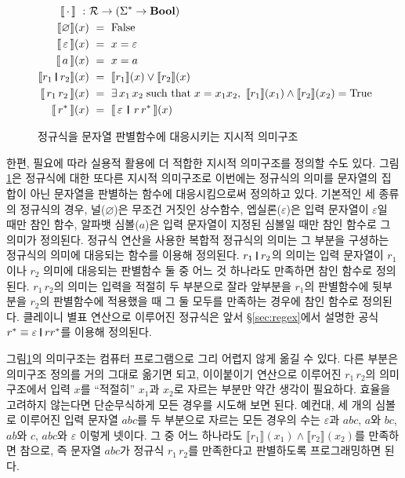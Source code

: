 \documentclass[b5paper,chapter,figtabcapt]{oblivoir}
\newcommand{\VERT}{\ensuremath{\mathop{\!\resizebox{1.65ex}{.7em}{\texttt{|}}\!}}}
\begin{document}
\begin{figure}
\begin{align*}
\llbracket\,\cdot\,\rrbracket
 ~:~& \mathcal{R} \to (\Sigma^{*} \to \textbf{Bool})
\\
\llbracket \varnothing \rrbracket(x)   &~=~ \text{False} \\
\llbracket\,\varepsilon\,\rrbracket(x) &~=~ x=\varepsilon \\
\llbracket\,a\,\rrbracket(x)           &~=~ x=a \\
\llbracket r_1 \VERT r_2 \rrbracket(x) &~=~
 \llbracket r_1\rrbracket(x) \lor \llbracket r_2\rrbracket(x)\\
\llbracket\,r_1 \, r_2\,\rrbracket(x) &~=~
  \exists\,x_1\,x_2 \;\text{such that}\; x=x_1x_2,~
  \llbracket r_1\rrbracket(x_1) \land \llbracket r_2\rrbracket(x_2)
  = \text{True} \\
\llbracket\, r^{*} \,\rrbracket(x) &~=~
 \llbracket\,\varepsilon\,\VERT\,r\,r^{*}\,\rrbracket(x)
\end{align*}
\caption{정규식을 문자열 판별함수에 대응시키는
         지시적 의미구조\label{fig:RegexDenoSem}}
\end{figure}

한편, 필요에 따라 실용적 활용에 더 적합한 지시적 의미구조를
정의할 수도 있다. 그림\;\ref{fig:RegexDenoSem}은 정규식에 대한
또다른 지시적 의미구조로 이번에는 정규식의 의미를 문자열의 집합이
아닌 문자열을 판별하는 함수에 대응시킴으로써 정의하고 있다. 기본적인
세 종류의 정규식의 경우, 널($\varnothing$)은 무조건 거짓인 상수함수,
엡실론($\varepsilon$)은 입력 문자열이 $\varepsilon$일 때만 참인 함수,
알파뱃 심볼($a$)은 입력 문자열이 지정된 심볼일 때만 참인 함수로 그
의미가 정의된다. 정규식 연산을 사용한 복합적 정규식의 의미는
그 부분을 구셩하는 정규식의 의미에 대응되는 함수를 이용해 정의된다.
$r_1\VERT r_2$의 의미는 입력 문자열이 $r_1$이나 $r_2$ 의미에 대응되는
판별함수 둘 중 어느 것 하나라도 만족하면 참인 함수로 정의된다.
$r_1\,r_2$의 의미는 입력을 적절히 두 부분으로 잘라 앞부분을 $r_1$의
판별함수에 뒷부분을 $r_2$의 판별함수에 적용했을 때 그 둘 모두를
만족하는 경우에 참인 함수로 정의된다. 클레이니 별표 연산으로
이루어진 정규식은 앞서 \S\ref{sec:regex}에서 설명한 공식
$r^{*} \equiv \varepsilon\VERT rr^{*}$를 이용해 정의된다.

그림\;\ref{fig:RegexDenoSem}의 의미구조는 컴퓨터 프로그램으로 그리
어렵지 않게 옮길 수 있다. 다른 부분은 의미구조 정의를 거의 그대로
옮기면 되고, 이이붙이기 연산으로 이루어진 $r_1\,r_2$의 의미구조에서
입력 $x$를 ``적절히'' $x_1$과 $x_2$로 자르는 부분만 약간 생각이 필요하다.
효율을 고려하지 않는다면 단순무식하게 모든 경우를 시도해 보면 된다.
예컨대, 세 개의 심볼로 이루어진 입력 문자열 $abc$를 두 부분으로 자르는
모든 경우의 수는 $\varepsilon$과 $abc$, $a$와 $bc$, $ab$와 $c$, $abc$와
$\varepsilon$ 이렇게 넷이다. 그 중 어느 하나라도
$\llbracket r_1\rrbracket(x_1) \land \llbracket r_2\rrbracket(x_2)$를
만족하면 참으로, 즉 문자열 $abc$가 정규식 $r_1\,r_2$를 만족한다고
판별하도록 프로그래밍하면 된다.
\end{document}
